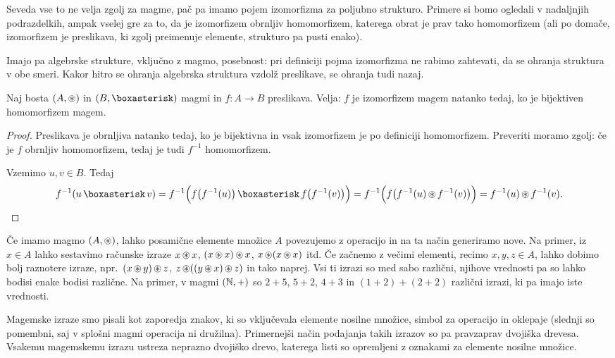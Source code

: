Seveda vse to ne velja zgolj za magme, pač pa imamo pojem izomorfizma za poljubno strukturo. Primere si bomo ogledali v nadaljnjih podrazdelkih, ampak vselej gre za to, da je izomorfizem obrnljiv homomorfizem, katerega obrat je prav tako homomorfizem (ali po domače, izomorfizem je preslikava, ki zgolj preimenuje elemente, strukturo pa pusti enako).

Imajo pa algebrske strukture, vključno z magmo, posebnost: pri definiciji pojma izomorfizma ne rabimo zahtevati, da se ohranja struktura v obe smeri. Kakor hitro se ohranja algebrska struktura vzdolž preslikave, se ohranja tudi nazaj.

\begin{trditev}
	Naj bosta $(A, \mathop{\circledast}\nolimits)$ in $(B, \soper)$ magmi in $f\colon A \to B$ preslikava. Velja: $f$ je izomorfizem magem natanko tedaj, ko je bijektiven homomorfizem magem.
\end{trditev}

\begin{proof}
	Preslikava je obrnljiva natanko tedaj, ko je bijektivna in vsak izomorfizem je po definiciji homomorfizem. Preveriti moramo zgolj: če je $f$ obrnljiv homomorfizem, tedaj je tudi $f^{-1}$ homomorfizem.
	
	Vzemimo $u, v \in B$. Tedaj
	\[f^{-1}(u \soper v) = f^{-1}\Big(f\big(f^{-1}(u)\big) \soper f\big(f^{-1}(v)\big)\Big) = f^{-1}\Big(f\big(f^{-1}(u) \oper f^{-1}(v)\big)\Big) = f^{-1}(u) \oper f^{-1}(v).\]
\end{proof}

Če imamo magmo $(A, \mathop{\circledast}\nolimits)$, lahko posamične elemente množice $A$ povezujemo z operacijo in na ta način generiramo nove. Na primer, iz $x \in A$ lahko sestavimo računske izraze $x \mathop{\circledast}\nolimits x$, $(x \mathop{\circledast}\nolimits x) \mathop{\circledast}\nolimits x$, $x \mathop{\circledast}\nolimits (x \mathop{\circledast}\nolimits x)$ itd. Če začnemo z večimi elementi, recimo $x, y, z \in A$, lahko dobimo bolj raznotere izraze, npr.~$(x \mathop{\circledast}\nolimits y) \mathop{\circledast}\nolimits z$, $z \mathop{\circledast}\nolimits ((y \mathop{\circledast}\nolimits x) \mathop{\circledast}\nolimits z)$ in tako naprej. Vsi ti izrazi so med sabo različni, njihove vrednosti pa so lahko bodisi enake bodisi različne. Na primer, v magmi $(\mathbb{N}, +)$ so $2 + 5$, $5 + 2$, $4 + 3$ in $(1 + 2) + (2 + 2)$ različni izrazi, ki pa imajo iste vrednosti.

Magemske izraze smo pisali kot zaporedja znakov, ki so vključevala elemente nosilne množice, simbol za operacijo in oklepaje (slednji so pomembni, saj v splošni magmi operacija ni družilna). Primernejši način podajanja takih izrazov so pa pravzaprav dvojiška drevesa. Vsakemu magemskemu izrazu ustreza neprazno dvojiško drevo, katerega listi so opremljeni z oznakami za elemente nosilne množice.

